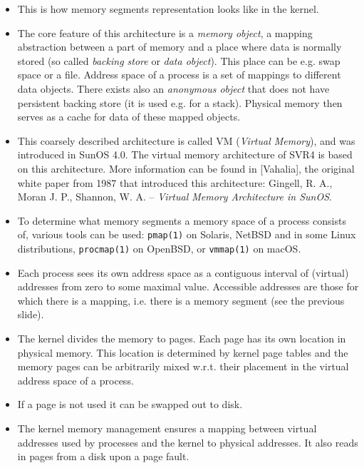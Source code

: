 \begin{itemize}
\item This is how memory segments representation looks like in the kernel.
\item The core feature of this architecture is a \emph{memory object}, a
mapping abstraction between a part of memory and a place where data is normally
stored (so called \emph{backing store} or \emph{data object}). This place can
be e.g. swap space or a file. Address space of a process is a set of mappings to
different data objects. There exists also an \emph{anonymous object} that does
not have persistent backing store (it is used e.g. for a stack). Physical memory
then serves as a cache for data of these mapped objects.
\item This coarsely described architecture is called VM (\emph{Virtual
Memory}), and was introduced in SunOS 4.0. The virtual memory architecture
of SVR4 is based on this architecture.  More information can be found in
[Vahalia], the original white paper from 1987 that introduced this architecture:
Gingell, R. A., Moran J.  P., Shannon, W.  A. -- \emph{Virtual Memory
Architecture in SunOS}.
\item To determine what memory segments a memory space of a process consists of,
various tools can be used: \texttt{pmap(1)} on Solaris, NetBSD and in some Linux
distributions, \texttt{procmap(1)} on OpenBSD, or \texttt{vmmap(1)} on macOS.
\end{itemize}



\begin{slide}
\begin{center}

\end{center}
\end{slide}

\begin{itemize}
\item Each process sees its own address space as a contiguous interval of
(virtual) addresses from zero to some maximal value.  Accessible addresses
are those for which there is a mapping, i.e. there is a memory
segment (see the previous slide).
\item The kernel divides the memory to pages. Each page has its own location in
physical memory. This location is determined by kernel page tables and the
memory pages can be arbitrarily mixed w.r.t. their placement in the virtual
address space of a process.
\item If a page is not used it can be swapped out to disk.
\item The kernel memory management ensures a mapping between virtual addresses
used by processes and the kernel to physical addresses.  It also reads in pages
from a disk upon a page fault.
\end{itemize}

